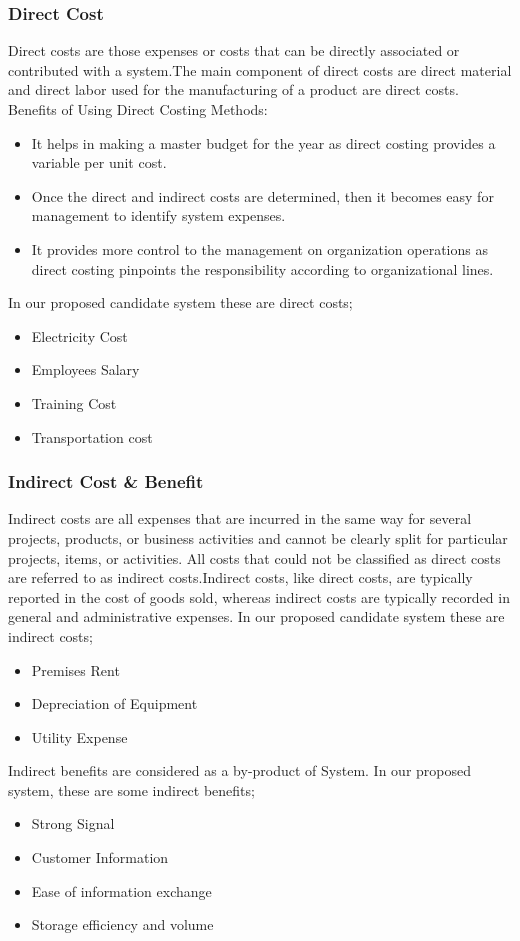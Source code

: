 \begin{spacing}{1}
\subsubsection {Direct Cost }
Direct costs are those expenses or costs that can be directly associated or contributed with a system.The main component of direct costs are direct material and direct labor used for the manufacturing of a product are direct costs. Benefits of Using Direct Costing Methods:
\begin{itemize}
\item It helps in making a master budget for the year as direct costing provides a variable per unit cost.
\item Once the direct and indirect costs are determined, then it becomes easy for management to identify system expenses.
\item It provides more control to the management on organization operations as direct costing pinpoints the responsibility according to organizational lines.
\end{itemize}
 In our proposed candidate system these are direct costs;
\begin{itemize}
\item Electricity Cost
\item Employees Salary
\item Training Cost
\item Transportation cost
\end{itemize}

\subsubsection{Indirect Cost \& Benefit }
Indirect costs are all expenses that are incurred in the same way for several projects, products, or business activities and cannot be clearly split for particular projects, items, or activities. All costs that could not be classified as direct costs are referred to as indirect costs.Indirect costs, like direct costs, are typically reported in the cost of goods sold, whereas indirect costs are typically recorded in general and administrative expenses.
In our proposed candidate system these are indirect costs;
\begin{itemize}
\item Premises Rent
\item Depreciation of Equipment
\item Utility Expense
\end{itemize}
Indirect benefits are considered as a by-product of System. In our proposed system, these are some indirect benefits;
\begin {itemize}
\item Strong Signal
\item Customer Information
\item Ease of information exchange
\item Storage efficiency and volume
\end{itemize}


\end{spacing}
